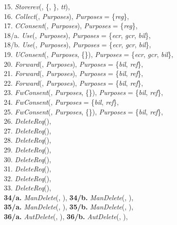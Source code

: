 \documentclass[a4paper]{article}
\begin{document}
\begin{figure}[htbp]
{\begin{minipage}{15.87 cm}
\begin{tabbing}
\ \ \ \ 15. \textit{Storerev}(, \{,  \}, \textit{tt}),
\\ \ \ \ \ 16. \textit{Collect}(, \textit{Purposes}), \textit{Purposes} = \{\textit{reg}\},\\
\ \ \ \  17. \textit{CConsent}(, \textit{Purposes}), \textit{Purposes} = \{\textit{reg}\},\\ 
\ \ \ \ 18/a. \textit{Use}(, \textit{Purposes}), \textit{Purposes} = \{\textit{ecr},   \textit{gcr}, \textit{bil}\},\\ 
\ \ \ \ 18/b. \textit{Use}(, \textit{Purposes}), \textit{Purposes} = \{\textit{ecr},   \textit{gcr}, \textit{bil}\},\\ 
\ \ \ \ 19. \textit{UConsent}(, \textit{Purposes}, \{\}), \textit{Purposes} = \{\textit{ecr},   \textit{gcr}, \textit{bil}\},\\ 
\ \ \ \ 20. \textit{Forward}(, \textit{Purposes}), \textit{Purposes} = \{\textit{bil},  \textit{ref}\},\\ 
\ \ \ \ 21. \textit{Forward}(, \textit{Purposes}), \textit{Purposes} = \{\textit{bil},  \textit{ref}\},\\ 
\ \ \ \ 22. \textit{Forward}(, \textit{Purposes}), \textit{Purposes} = \{\textit{bil},  \textit{ref}\},\\ 
\ \ \ \ 23. \textit{FwConsent}(, \textit{Purposes}, \{\}), \textit{Purposes} = \{\textit{bil},  \textit{ref}\},\\ 
\ \ \ \ 24. \textit{FwConsent}(,  \textit{Purposes} = \{\textit{bil},  \textit{ref}\},\\ 
\ \ \ \ 25. \textit{FwConsent}(, \textit{Purposes}, \{\}),  \textit{Purposes} = \{\textit{bil},  \textit{ref}\},\\ 
\ \ \ \ 26. \textit{DeleteReq}(),\\
\ \ \ \ 27. \textit{DeleteReq}(),\\
\ \ \ \ 28. \textit{DeleteReq}(),\\
\ \ \ \ 29. \textit{DeleteReq}(),\\
\ \ \ \ 30. \textit{DeleteReq}(),\\
\ \ \ \ 31. \textit{DeleteReq}(),\\
\ \ \ \ 32. \textit{DeleteReq}(),\\
\ \ \ \ 33. \textit{DeleteReq}(),\\
\ \ \ \ \textbf{34/a.} \textit{ManDelete}(, ), \textbf{34/b.} \textit{ManDelete}(, ),\\
\ \ \ \ \textbf{35/a.} \textit{ManDelete}(, ), \textbf{35/b.} \textit{ManDelete}(, ),\\
\ \ \ \ \textbf{36/a.} \textit{AutDelete}(, ), \textbf{36/b.} \textit{AutDelete}(, ),\\

\end{tabbing}
\end{minipage}}
\end{figure}
\end{document}
